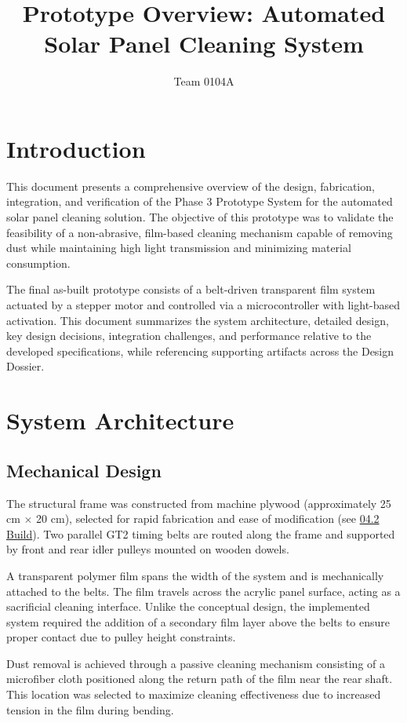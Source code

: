 \documentclass[12pt]{article}
\title{\textbf{Prototype Overview: Automated Solar Panel Cleaning System}}
\author{Team 0104A}
\date{}
\begin{document}
\maketitle

\section{Introduction}

This document presents a comprehensive overview of the design, fabrication, integration, and verification of the Phase 3 Prototype System for the automated solar panel cleaning solution. The objective of this prototype was to validate the feasibility of a non-abrasive, film-based cleaning mechanism capable of removing dust while maintaining high light transmission and minimizing material consumption.

The final as-built prototype consists of a belt-driven transparent film system actuated by a stepper motor and controlled via a microcontroller with light-based activation. This document summarizes the system architecture, detailed design, key design decisions, integration challenges, and performance relative to the developed specifications, while referencing supporting artifacts across the Design Dossier.

\section{System Architecture}

\subsection{Mechanical Design}

The structural frame was constructed from machine plywood (approximately 25 cm $\times$ 20 cm), selected for rapid fabrication and ease of modification (see \href{}{04.2 Build}). Two parallel GT2 timing belts are routed along the frame and supported by front and rear idler pulleys mounted on wooden dowels.

A transparent polymer film spans the width of the system and is mechanically attached to the belts. The film travels across the acrylic panel surface, acting as a sacrificial cleaning interface. Unlike the conceptual design, the implemented system required the addition of a secondary film layer above the belts to ensure proper contact due to pulley height constraints.

Dust removal is achieved through a passive cleaning mechanism consisting of a microfiber cloth positioned along the return path of the film near the rear shaft. This location was selected to maximize cleaning effectiveness due to increased tension in the film during bending.
\end{document}
